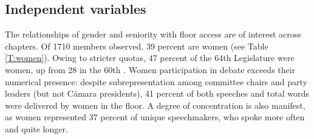 \documentclass[letter,12pt]{article}
\begin{document}





  \subsection{Independent variables}




  The relationships of gender and seniority with floor access are of interest across chapters. Of 1710 members observed, 39 percent are women (see Table \ref{T:women}). Owing to stricter quotas, 47 percent of the 64th Legislature were women, up from 28 in the 60th \citep{piscopo.2016}. Women participation in debate exceeds their numerical presence: despite subrepresentation among committee chairs and party leaders (but not Cámara presidents), 41 percent of both speeches and total words were delivered by women in the floor. A degree of concentration is also manifest, as women represented 37 percent of unique speechmakers, who  spoke more often and quite longer. 
\end{document}
